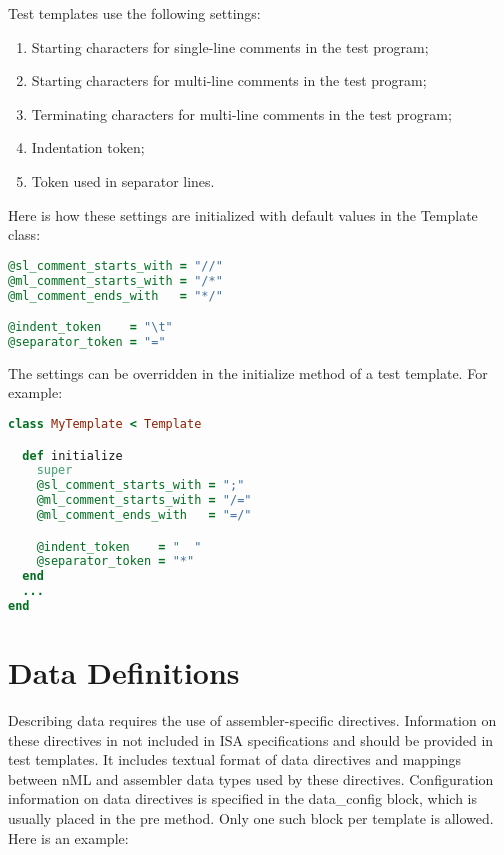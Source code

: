 \documentclass[oneside,final,14pt]{extreport}
\begin{document}
{Test templates use the following settings:

\begin{enumerate}
  \item Starting characters for single-line comments in the test program;
  \item Starting characters for multi-line comments in the test program;
  \item Terminating characters for multi-line comments in the test program;
  \item Indentation token;
  \item Token used in separator lines.
\end{enumerate}

Here is how these settings are initialized with default values in the Template class:

\begin{lstlisting}[language=ruby]
@sl_comment_starts_with = "//"
@ml_comment_starts_with = "/*"
@ml_comment_ends_with   = "*/"

@indent_token    = "\t"
@separator_token = "="
\end{lstlisting}

The settings can be overridden in the initialize method of a test template. For example:

\begin{lstlisting}[language=ruby]
class MyTemplate < Template

  def initialize
    super
    @sl_comment_starts_with = ";" 
    @ml_comment_starts_with = "/="
    @ml_comment_ends_with   = "=/"

    @indent_token    = "  "
    @separator_token = "*" 
  end
  ...
end
\end{lstlisting}


\section{Data Definitions}

Describing data requires the use of assembler-specific directives. Information on
these directives in not included in ISA specifications and should be provided in test
templates. It includes textual format of data directives and mappings between nML and
assembler data types used by these directives. Configuration information on data
directives is specified in the data{\_}config block, which is usually placed in the
pre method. Only one such block per template is allowed. Here is an example:

}
\end{document}
